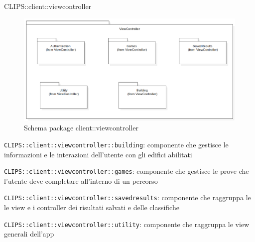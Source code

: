 \begin{componente}{CLIPS::client::viewcontroller}
\begin{figure}[h!]
\centering
\includegraphics[scale=0.4]{img/package/png/client--viewcontroller.png}
\caption{Schema package client::viewcontroller}
 \end{figure}
\begin{compPackageContenuti}
\item \texttt{CLIPS::client::viewcontroller::building}: componente che gestisce le informazioni e le interazioni dell'utente con gli edifici abilitati
\item \texttt{CLIPS::client::viewcontroller::games}: componente che gestisce le prove che l'utente deve completare all'interno di un percorso
\item \texttt{CLIPS::client::viewcontroller::savedresults}: componente che raggruppa le le view e i controller dei risultati salvati e delle classifiche
\item \texttt{CLIPS::client::viewcontroller::utility}: componente che raggruppa le view generali dell'app
\end{compPackageContenuti}
\end{componente}
